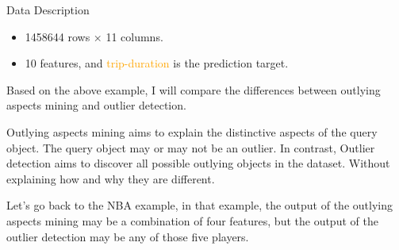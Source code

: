 \documentclass[
 size=14pt,
 paper=smartboard,  %
 mode=present, 		%
 display=slides, 	%
 style=tuliplab,  	%
 pauseslide,
 fleqn,leqno]{powerdot}
\begin{document}
\begin{slide}[toc=,bm=]{Data Description}
\begin{itemize}
\item
1458644 rows × 11 columns.

\item
10 features, and \textcolor{orange}{trip-duration} is the prediction target.

\end{itemize}

\begin{note}
Based on the above example,
I will compare the differences
between outlying aspects mining and outlier detection.

Outlying aspects mining aims to
explain the distinctive aspects of the query object.
The query object may or may not be an outlier.
In contrast,
Outlier detection aims to discover all possible
outlying objects in the dataset.
Without explaining how and why they are different.


Let's go back to the NBA example,
in that example,
the output of the outlying aspects mining may be
a combination of four features,
but the output of the outlier detection may be any of those five players.
\end{note}

\end{slide}
\end{document}
